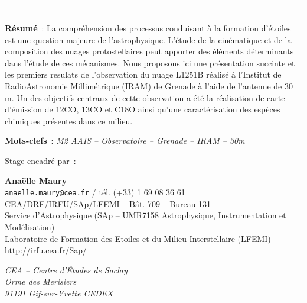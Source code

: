 \documentclass[a4paper,10pt,french]{article}
\begin{document}
\begin{center}

    \vspace{1.5cm}

    \rule[11pt]{5cm}{0.5pt}

    \textbf{\huge \thetitle}

    \rule{5cm}{0.5pt}

    \vspace{1.5cm}

    \parbox{15cm}{\textbf{Résumé} :
    La compréhension des processus conduisant à la formation d'étoiles est une question majeure de l'astrophysique. L'étude de la cinématique et de la composition des nuages protostellaires peut apporter des éléments déterminants dans l'étude de ces mécanismes. Nous proposons ici une présentation succinte et les premiers resulats de l'observation du nuage L1251B réalisé à l'Institut de RadioAstronomie Millimétrique (IRAM) de Grenade à l'aide de l'antenne de 30 m. Un des objectifs centraux de cette observation a été la réalisation de carte d'émission de 12CO, 13CO et C18O ainsi qu'une caractérisation des espèces chimiques présentes dans ce milieu. 
    }
    

    \vspace{0.5cm}

    \parbox{15cm}{
        \textbf{Mots-clefs} : \it M2 AAIS – Observatoire – Grenade – IRAM – 30m
    }

    \vspace{0.5cm}

    \parbox{15cm}{
        Stage encadré par :

        \textbf{Anaëlle Maury} \\
        \href{mailto:anaelle.maury@cea.fr}{\tt anaelle.maury@cea.fr} / tél. (+33) 1 69 08 36 61 \\
        CEA/DRF/IRFU/SAp/LFEMI – Bât. 709 – Bureau 131 \\
        Service d’Astrophysique (SAp – UMR7158 Astrophysique, Instrumentation et Modélisation) \\
        Laboratoire de Formation des Etoiles et du Milieu Interstellaire (LFEMI) \\
        \url{http://irfu.cea.fr/Sap/}

        \textit{%
            CEA – Centre d’Études de Saclay \\
            Orme des Merisiers \\
            91191 Gif-sur-Yvette CEDEX
        }
    }


\end{center}
\end{document}
